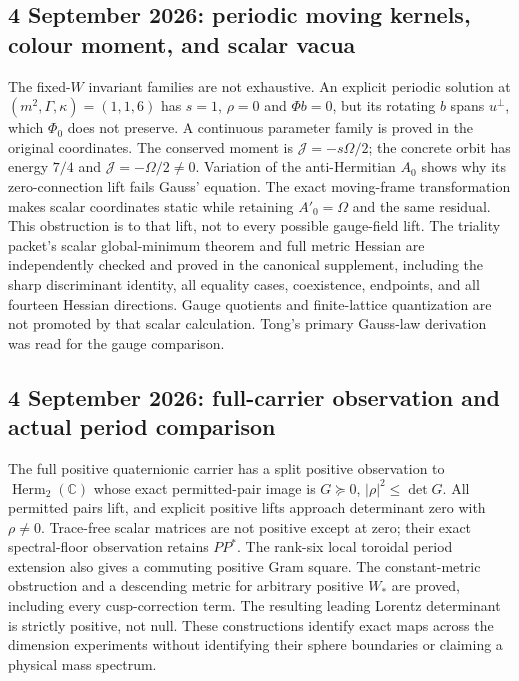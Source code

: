\subsection*{4 September 2026: periodic moving kernels, colour moment, and scalar vacua}
The fixed-$W$ invariant families are not exhaustive. An explicit periodic
solution at $(m^2,\Gamma,\kappa)=(1,1,6)$ has $s=1$, $\rho=0$ and
$\Phi b=0$, but its rotating $b$ spans $u^\perp$, which $\Phi_0$ does
not preserve. A continuous parameter family is proved in the original
coordinates. The conserved moment is $\mathcal J=-s\Omega/2$; the
concrete orbit has energy $7/4$ and $\mathcal J=-\Omega/2\ne0$.
Variation of the anti-Hermitian $A_0$ shows why its zero-connection lift
fails Gauss' equation. The exact moving-frame transformation makes scalar
coordinates static while retaining $A'_0=\Omega$ and the same residual.
This obstruction is to that lift, not to every possible gauge-field lift.
The triality packet's scalar global-minimum theorem and full metric Hessian
are independently checked and proved in the canonical supplement, including
the sharp discriminant identity, all equality cases, coexistence, endpoints,
and all fourteen Hessian directions. Gauge quotients and finite-lattice
quantization are not promoted by that scalar calculation. Tong's primary
Gauss-law derivation was read for the gauge comparison.
\subsection*{4 September 2026: full-carrier observation and actual period comparison}
The full positive quaternionic carrier has a split positive observation to
$\operatorname{Herm}_2(\mathbb C)$ whose exact permitted-pair image is
$G\succeq0$, $|\rho|^2\leq\det G$. All permitted pairs lift, and
explicit positive lifts approach determinant zero with $\rho\ne0$.
Trace-free scalar matrices are not positive except at zero; their exact
spectral-floor observation retains $PP^*$. The rank-six local toroidal
period extension also gives a commuting positive Gram square. The
constant-metric obstruction and a descending metric for arbitrary positive
$W_*$ are proved, including every cusp-correction term. The resulting
leading Lorentz determinant is strictly positive, not null. These
constructions identify exact maps across the dimension experiments without
identifying their sphere boundaries or claiming a physical mass spectrum.

